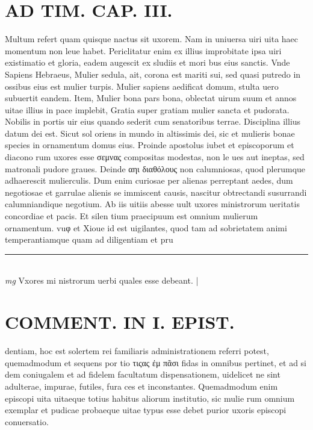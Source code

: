 \documentclass{article}
\begin{document}
\begin{pages}
\section*{AD TIM. CAP. III. }
\marginpar{[ p.132 ]}\pstart Multum refert quam quisque nactus sit uxorem. Nam in uniuersa uiri uita haec momentum non leue habet. Periclitatur enim ex illius improbitate ipsa uiri existimatio et gloria, eadem augescit ex sludiis et mori bus eius sanctis. Vnde Sapiens Hebraeus, Mulier sedula, ait, corona est mariti sui, sed quasi putredo in ossibus eius est mulier turpis. Mulier sapiens aedificat domum, stulta uero subuertit eandem. Item, Mulier bona pars bona, oblectat uirum suum et annos uitae illius in pace implebit, Gratia super gratiam mulier sancta et pudorata. Nobilis in portis uir eius quando sederit cum senatoribus terrae. Disciplina illius datum dei est. Sicut sol oriens in mundo in altissimis dei, sic et mulieris bonae species in ornamentum domus eius. Proinde apostolus iubet et episcoporum et diacono rum uxores esse σεμνας compositas modestas, non le ues aut ineptas, sed matronali pudore graues. Deinde αηι διαθόλους non calumniosas, quod plerumque adhaerescit mulierculis. Dum enim curiosae per alienas perreptant aedes, dum negotiosae et garrulae alienis se immiscent causis, nascitur obtrectandi susurrandi calumniandique negotium. Ab iis uitiis abesse uult uxores ministrorum ueritatis concordiae et pacis. Et silen tium praecipuum est omnium mulierum ornamentum. vuφ et Xioue id est uigilantes, quod tam ad sobrietatem animi temperantiamque quam ad diligentiam et pru\pend
\vspace{0.5cm}\noindent
\vspace{0.2cm}\rule{1cm}{0.2pt}\\ 
\hspace{0.2cm}\textit{mg}
\footnotesize Vxores mi nistrorum uerbi quales esse debeant. 
\normalsize| 
\section*{COMMENT. IN I. EPIST. }\pstart dentiam, hoc est solertem rei familiaris administrationem referri potest, quemadmodum et sequens por tio τιςας ἐμ πᾶσι fidas in omnibus pertinet, et ad si dem coniugalem et ad fidelem facultatum dispensationem, uidelicet ne sint adulterae, impurae, futiles, fura ces et inconstantes. Quemadmodum enim episcopi uita uitaeque totius habitus aliorum institutio, sic mulie rum omnium exemplar et pudicae probaeque uitae typus esse debet purior uxoris episcopi conuersatio.  \pend
{}
{}

\end{pages}
\end{document}
